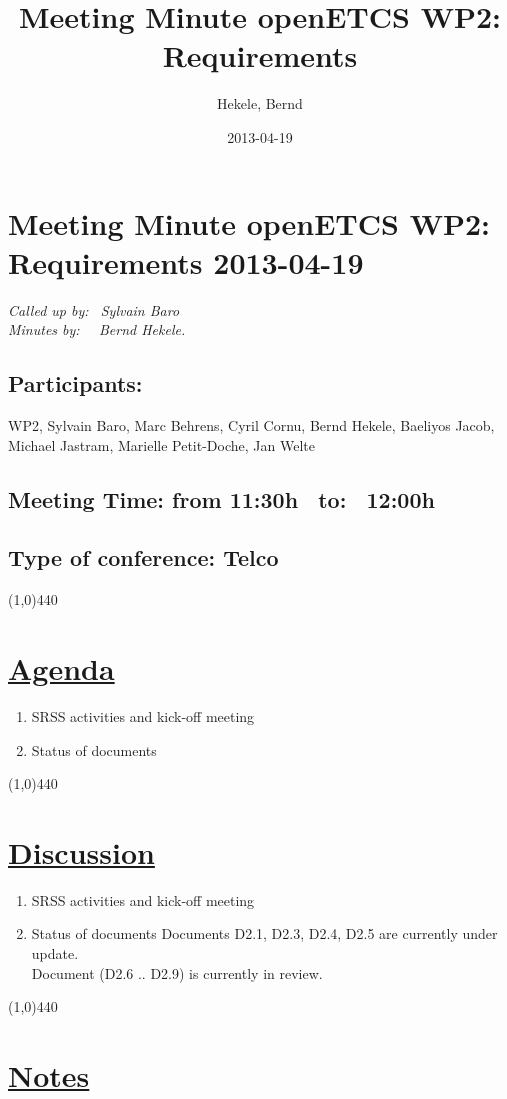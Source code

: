 \documentclass[a4paper]{article}
\title{Meeting Minute openETCS WP2: Requirements}
\author{Hekele, Bernd}
\date{2013-04-19}
\begin{document}
\section*{\large{Meeting Minute openETCS WP2: Requirements 2013-04-19}}

\emph{Called up by: \ Sylvain Baro}\\
\emph{Minutes by: \ \  Bernd Hekele.}

\subsection*{Participants:} WP2, 
Sylvain Baro,
Marc Behrens, 
Cyril Cornu,
Bernd Hekele,
Baeliyos Jacob,
Michael Jastram, 
Marielle Petit-Doche, 
Jan Welte\\

\subsection*{Meeting Time: from 11:30h \ to: \ 12:00h}

\subsection*{Type of conference: Telco}

\line(1,0){440}
\section*{\underline{Agenda}}
\begin{enumerate}
\item SRSS activities and kick-off meeting
\item Status of documents
\end{enumerate}
\line(1,0){440}
\section*{\underline{Discussion}}
\begin{enumerate}
\item SRSS activities and kick-off meeting
\item Status of documents
Documents D2.1, D2.3, D2.4, D2.5 are currently under update.\\
Document (D2.6 .. D2.9) is currently in review. 
\end{enumerate}
\line(1,0){440}
\section*{\underline{Notes}}
\end{document}

